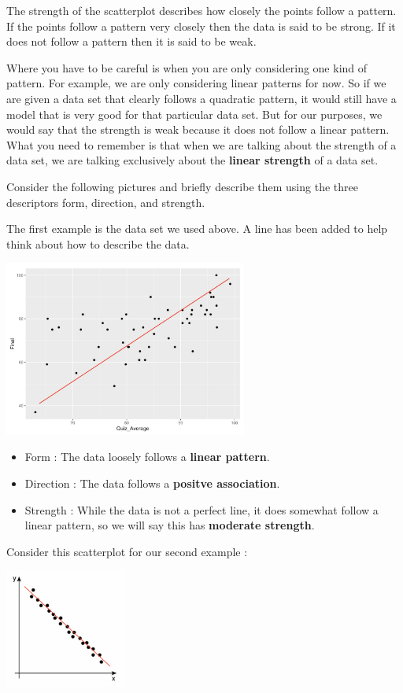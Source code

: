 \documentclass[
  letterpaper,
  DIV=11,
  numbers=noendperiod]{scrreprt}
\providecommand{\tightlist}{%
  \setlength{\itemsep}{0pt}\setlength{\parskip}{0pt}}\usepackage{longtable,booktabs,array}
\begin{document}
The strength of the scatterplot describes how closely the points follow
a pattern. If the points follow a pattern very closely then the data is
said to be strong. If it does not follow a pattern then it is said to be
weak.

Where you have to be careful is when you are only considering one kind
of pattern. For example, we are only considering linear patterns for
now. So if we are given a data set that clearly follows a quadratic
pattern, it would still have a model that is very good for that
particular data set. But for our purposes, we would say that the
strength is weak because it does not follow a linear pattern. What you
need to remember is that when we are talking about the strength of a
data set, we are talking exclusively about the \textbf{linear strength}
of a data set.

Consider the following pictures and briefly describe them using the
three descriptors form, direction, and strength.

The first example is the data set we used above. A line has been added
to help think about how to describe the data.

\includegraphics[width=0.6\textwidth,height=\textheight]{./images/SC_1.jpg}

\begin{itemize}
\tightlist
\item
  Form : The data loosely follows a \textbf{linear pattern}.
\item
  Direction : The data follows a \textbf{positve association}.
\item
  Strength : While the data is not a perfect line, it does somewhat
  follow a linear pattern, so we will say this has \textbf{moderate
  strength}.
\end{itemize}

Consider this scatterplot for our second example :

\includegraphics[width=0.3\textwidth,height=\textheight]{./images/SC_2.jpg}
\end{document}
